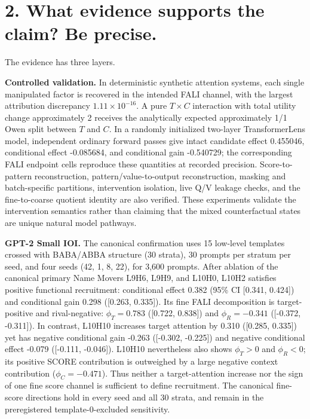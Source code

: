 \documentclass[10pt]{article}
\begin{document}
\section*{2. What evidence supports the claim? Be precise.}

The evidence has three layers.

\textbf{Controlled validation.} In deterministic synthetic attention systems, each single manipulated factor is recovered in the intended FALI channel, with the largest attribution discrepancy $1.11\times10^{-16}$. A pure $T\times C$ interaction with total utility change approximately 2 receives the analytically expected approximately 1/1 Owen split between $T$ and $C$. In a randomly initialized two-layer TransformerLens model, independent ordinary forward passes give intact candidate effect 0.455046, conditional effect -0.085684, and conditional gain -0.540729; the corresponding FALI endpoint cells reproduce these quantities at recorded precision. Score-to-pattern reconstruction, pattern/value-to-output reconstruction, masking and batch-specific partitions, intervention isolation, live Q/V leakage checks, and the fine-to-coarse quotient identity are also verified. These experiments validate the intervention semantics rather than claiming that the mixed counterfactual states are unique natural model pathways.

\textbf{GPT-2 Small IOI.} The canonical confirmation uses 15 low-level templates crossed with BABA/ABBA structure (30 strata), 30 prompts per stratum per seed, and four seeds (42, 1, 8, 22), for 3,600 prompts. After ablation of the canonical primary Name Movers L9H6, L9H9, and L10H0, L10H2 satisfies positive functional recruitment: conditional effect 0.382 (95\% CI [0.341, 0.424]) and conditional gain 0.298 ([0.263, 0.335]). Its fine FALI decomposition is target-positive and rival-negative: $\phi_T=0.783$ ([0.722, 0.838]) and $\phi_R=-0.341$ ([-0.372, -0.311]). In contrast, L10H10 increases target attention by 0.310 ([0.285, 0.335]) yet has negative conditional gain -0.263 ([-0.302, -0.225]) and negative conditional effect -0.079 ([-0.111, -0.046]). L10H10 nevertheless also shows $\phi_T>0$ and $\phi_R<0$; its positive SCORE contribution is outweighed by a large negative context contribution ($\phi_C=-0.471$). Thus neither a target-attention increase nor the sign of one fine score channel is sufficient to define recruitment. The canonical fine-score directions hold in every seed and all 30 strata, and remain in the preregistered template-0-excluded sensitivity.
\end{document}
